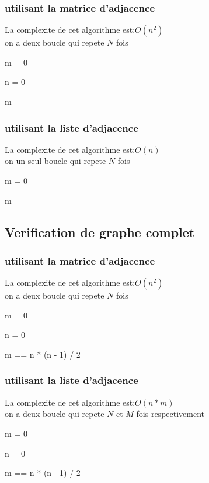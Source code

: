 \documentclass{report}
\begin{document}
\subsubsection{utilisant la matrice d'adjacence}
La complexite de cet algorithme est:\(O(n^{2})\)\\
on a deux boucle qui repete \(N\) fois
\begin{algorithm}
m = 0

n = 0

\Return m
\caption{}
\end{algorithm}

\subsubsection{utilisant la liste d'adjacence}
La complexite de cet algorithme est:\(O(n)\)\\
on un seul boucle qui repete \(N\) fois
\begin{algorithm}
m = 0

\Return m
\caption{}
\end{algorithm}

\subsection{Verification de graphe complet}
\subsubsection{utilisant la matrice d'adjacence}
La complexite de cet algorithme est:\(O(n^{2})\)\\
on a deux boucle qui repete \(N\) fois
\begin{algorithm}
m = 0

n = 0

\Return m == n * (n - 1) / 2
\caption{}
\end{algorithm}

\subsubsection{utilisant la liste d'adjacence}
La complexite de cet algorithme est:\(O(n*m)\)\\
on a deux boucle qui repete \(N\) et \(M\) fois respectivement
\begin{algorithm}
m = 0

n = 0

\Return m == n * (n - 1) / 2
\caption{}
\end{algorithm}
\end{document}

